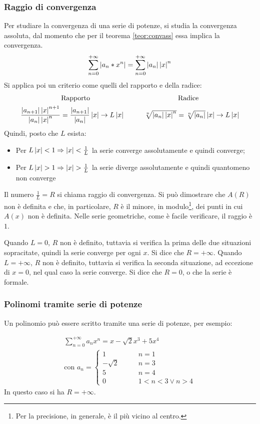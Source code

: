 \subsubsection{Raggio di convergenza}
Per studiare la convergenza di una serie di potenze, si studia la convergenza assoluta, dal momento che per il teorema \ref{teor:convass} essa implica la convergenza.
\[
	\sum_{n=0}^{+\infty}\left\lvert a_n*x^n \right\rvert=\sum_{n=0}^{+\infty}\left\lvert a_n \right\rvert\left\lvert x \right\rvert^n
\]
Si applica poi un criterio come quelli del rapporto e della radice:
\[
	\begin{array}{cc}
		\text{Rapporto}                                                                                                 & \text{Radice}                                                            \\[1ex]
		\dfrac{\left\lvert a_{n+1} \right\rvert\left\lvert x \right\rvert^{n+1}}{\left\lvert a_n \right\rvert\left\lvert x \right\rvert^n}=\dfrac{\left\lvert a_{n+1} \right\rvert}{\left\lvert a_n \right\rvert}\left\lvert x \right\rvert\to L\left\lvert x \right\rvert\quad & \quad\sqrt[n]{\left\lvert a_n \right\rvert\left\lvert x \right\rvert^n}=\sqrt[n]{\left\lvert a_n \right\rvert}\left\lvert x \right\rvert\to L\left\lvert x \right\rvert
	\end{array}
\]
Quindi, posto che $L$ esista:
\begin{itemize}
	\item Per $L\left\lvert x \right\rvert<1\Rightarrow \left\lvert x \right\rvert<\frac{1}{L}$ la serie converge assolutamente e quindi converge;
	\item Per $L\left\lvert x \right\rvert>1\Rightarrow \left\lvert x \right\rvert>\frac{1}{L}$ la serie diverge assolutamente e quindi quantomeno non converge
\end{itemize}
Il numero $\frac{1}{L}=R$ si chiama raggio di convergenza. Si può dimostrare che $A(R)$ non è definita e che, in particolare, $R$ è il minore, in modulo\footnote{Per la precisione, in generale, è il più vicino al centro.}, dei punti in cui $A(x)$ non è definita. Nelle serie geometriche, come è facile verificare, il raggio è $1$.

Quando $L=0$, $R$ non è definito, tuttavia si verifica la prima delle due situazioni sopracitate, quindi la serie converge per ogni $x$. Si dice che $R=+\infty$. Quando $L=+\infty$, $R$ non è definito, tuttavia si verifica la seconda situazione, ad eccezione di $x=0$, nel qual caso la serie converge. Si dice che $R=0$, o che la serie è formale.

\subsubsection{Polinomi tramite serie di potenze}
Un polinomio può essere scritto tramite una serie di potenze, per esempio:
\begin{examp}
	\begin{gather*}
		\sum_{n=0}^{+\infty} a_n x^n= x-\sqrt2 x^3 + 5x^4\\
		\text{con }a_n=
		\begin{cases}
			1\qquad       & n=1           \\
			-\sqrt2\qquad & n=3           \\
			5\qquad       & n=4           \\
			0\qquad       & 1<n<3\lor n>4
		\end{cases}
	\end{gather*}
	In questo caso si ha $R=+\infty$.
\end{examp}


